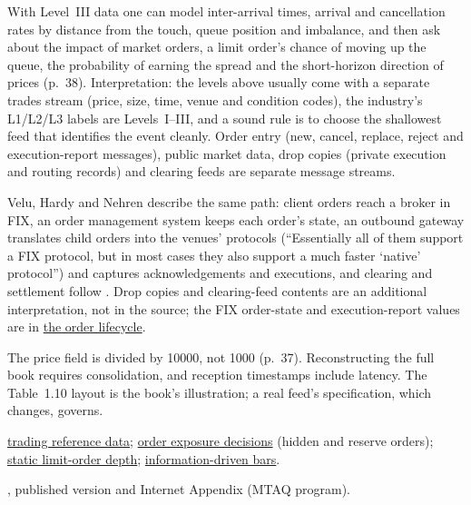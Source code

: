 \begin{qfdata}
 With Level~III data one can model inter-arrival times, arrival and cancellation rates by distance from the touch, queue position and imbalance, and then ask about the impact of market orders, a limit order's chance of moving up the queue, the probability of earning the spread and the short-horizon direction of prices (p.~38). Interpretation: the levels above usually come with a separate trades stream (price, size, time, venue and condition codes), the industry's L1/L2/L3 labels are Levels~I--III, and a sound rule is to choose the shallowest feed that identifies the event cleanly. Order entry (new, cancel, replace, reject and execution-report messages), public market data, drop copies (private execution and routing records) and clearing feeds are separate message streams.

Velu, Hardy and Nehren describe the same path: client orders reach a broker in FIX, an order management system keeps each order's state, an outbound gateway translates child orders into the venues' protocols (``Essentially all of them support a FIX protocol, but in most cases they also support a much faster `native' protocol'') and captures acknowledgements and executions, and clearing and settlement follow \citep[chap.~11, sec.~11.1, pp.~383--386]{s3-velu}. Drop copies and clearing-feed contents are an additional interpretation, not in the source; the FIX order-state and execution-report values are in \hyperref[mech:order-lifecycle]{the order lifecycle}.

 The price field is divided by 10000, not 1000 (p.~37). Reconstructing the full book requires consolidation, and reception timestamps include latency. The Table~1.10 layout is the book's illustration; a real feed's specification, which changes, governs.

 \hyperref[data:trading-reference-data]{trading reference data}; \hyperref[def:order-exposure-decisions]{order exposure decisions} (hidden and reserve orders); \hyperref[mod:static-limit-order-depth]{static limit-order depth}; \hyperref[meth:information-driven-bars]{information-driven bars}.

 \citep{wide-holden-jacobsen}, published version and Internet Appendix (MTAQ program).

\end{qfdata}

